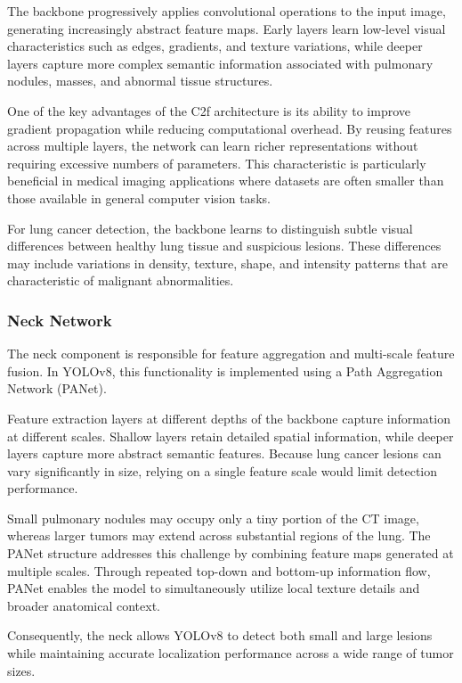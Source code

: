 The backbone progressively applies convolutional operations to the input image, generating increasingly abstract feature maps. Early layers learn low-level visual characteristics such as edges, gradients, and texture variations, while deeper layers capture more complex semantic information associated with pulmonary nodules, masses, and abnormal tissue structures.

One of the key advantages of the C2f architecture is its ability to improve gradient propagation while reducing computational overhead. By reusing features across multiple layers, the network can learn richer representations without requiring excessive numbers of parameters. This characteristic is particularly beneficial in medical imaging applications where datasets are often smaller than those available in general computer vision tasks.

For lung cancer detection, the backbone learns to distinguish subtle visual differences between healthy lung tissue and suspicious lesions. These differences may include variations in density, texture, shape, and intensity patterns that are characteristic of malignant abnormalities.

\subsubsection{Neck Network}

The neck component is responsible for feature aggregation and multi-scale feature fusion. In YOLOv8, this functionality is implemented using a Path Aggregation Network (PANet).

Feature extraction layers at different depths of the backbone capture information at different scales. Shallow layers retain detailed spatial information, while deeper layers capture more abstract semantic features. Because lung cancer lesions can vary significantly in size, relying on a single feature scale would limit detection performance.

Small pulmonary nodules may occupy only a tiny portion of the CT image, whereas larger tumors may extend across substantial regions of the lung. The PANet structure addresses this challenge by combining feature maps generated at multiple scales. Through repeated top-down and bottom-up information flow, PANet enables the model to simultaneously utilize local texture details and broader anatomical context.

Consequently, the neck allows YOLOv8 to detect both small and large lesions while maintaining accurate localization performance across a wide range of tumor sizes.

